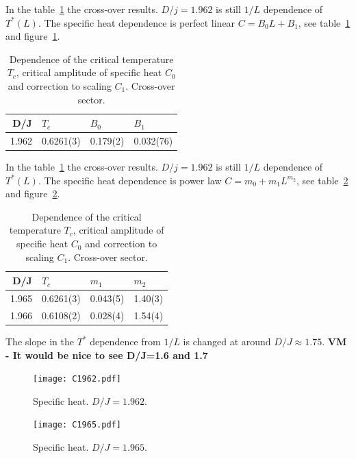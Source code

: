 \documentclass[aps,prl,amssymb,amsmath,twocolumn,floatfix]{revtex4}
\begin{document}
 In the table~\ref{table2} the cross-over results. $D/j=1.962$ is still $1/L$ dependence of $T^*(L)$. The specific heat dependence is perfect linear $C=B_0L+B_1$, see table~\ref{table2} and figure~\ref{fig:C1962}.
 
 \begin{table}[ht]
\caption{Dependence of the critical temperature $T_c$, critical amplitude of specific heat $C_0$ and correction to scaling $C_1$. Cross-over sector.}
\label{table2}
\begin{tabular}{|r|l|l|l|}
\hline
D/J &  $T_c$    &  $B_0$  &$B_1$        \\
\hline
 1.962 & 0.6261(3) & 0.179(2) & 0.032(76) \\
 \hline
\end{tabular}
\end{table}
 
 In the table~\ref{table2} the cross-over results. $D/j=1.962$ is still $1/L$ dependence of $T^*(L)$. The specific heat dependence is power law $C=m_0+m_1L^{m_2}$, see table~\ref{table3} and figure~\ref{fig:C1965}.

 
 \begin{table}[ht]
\caption{Dependence of the critical temperature $T_c$, critical amplitude of specific heat $C_0$ and correction to scaling $C_1$. Cross-over sector.}
\label{table3}
\begin{tabular}{|r|l|l|l|}
\hline
D/J &  $T_c$    &  $m_1$  &$m_2$        \\
\hline
 1.965 & 0.6261(3) & 0.043(5) & 1.40(3) \\
 1.966 & 0.6108(2) & 0.028(4) & 1.54(4) \\
 
 \hline
\end{tabular}
\end{table}

 
 


The slope in the $T^*$ dependence from $1/L$ is changed at around $D/J\approx 1.75$.
{\bf VM - It would be nice to see D/J=1.6 and 1.7}



\begin{figure}
  \centering
  \texttt{[image: C1962.pdf]}
  \caption{Specific heat. $D/J=1.962$. }
  \label{fig:C1962}
\end{figure}

\begin{figure}
  \centering
  \texttt{[image: C1965.pdf]}
  \caption{Specific heat. $D/J=1.965$. }
  \label{fig:C1965}
\end{figure}
\end{document}
